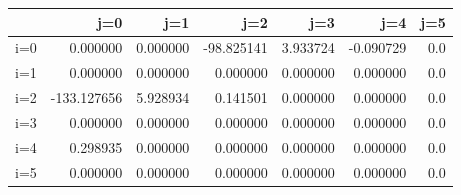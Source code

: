 \begin{tabular}{lrrrrrr}
\toprule
{} &         j=0 &       j=1 &        j=2 &       j=3 &       j=4 &  j=5 \\
\midrule
i=0 &    0.000000 &  0.000000 & -98.825141 &  3.933724 & -0.090729 &  0.0 \\
i=1 &    0.000000 &  0.000000 &   0.000000 &  0.000000 &  0.000000 &  0.0 \\
i=2 & -133.127656 &  5.928934 &   0.141501 &  0.000000 &  0.000000 &  0.0 \\
i=3 &    0.000000 &  0.000000 &   0.000000 &  0.000000 &  0.000000 &  0.0 \\
i=4 &    0.298935 &  0.000000 &   0.000000 &  0.000000 &  0.000000 &  0.0 \\
i=5 &    0.000000 &  0.000000 &   0.000000 &  0.000000 &  0.000000 &  0.0 \\
\bottomrule
\end{tabular}
